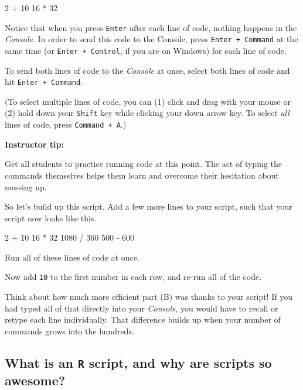 \documentclass[
]{book}
\newenvironment{Shaded}{\begin{snugshade}}{\end{snugshade}}
\newcommand{\DecValTok}[1]{\textcolor[rgb]{0.00,0.00,0.81}{#1}}
\newcommand{\SpecialCharTok}[1]{\textcolor[rgb]{0.00,0.00,0.00}{#1}}
\begin{document}
\begin{Shaded}
\begin{Highlighting}[]
\DecValTok{2}  \SpecialCharTok{+} \DecValTok{10}
\DecValTok{16} \SpecialCharTok{*} \DecValTok{32}
\end{Highlighting}
\end{Shaded}

Notice that when you press \texttt{Enter} after each line of code, nothing happens in the \emph{Console}. In order to send this code to the Console, press \texttt{Enter\ +\ Command} at the same time (or \texttt{Enter\ +\ Control}, if you are on Windows) for each line of code.

To send both lines of code to the \emph{Console} at once, select both lines of code and hit \texttt{Enter\ +\ Command}.

(To select multiple lines of code, you can (1) click and drag with your mouse or (2) hold down your \texttt{Shift} key while clicking your down arrow key. To select \emph{all} lines of code, press \texttt{Command\ +\ A}.)

\leavevmode{}%
\textbf{Instructor tip:}

Get all students to practice running code at this point. The act of typing the commands themselves helps them learn and overcome their hesitation about messing up.

So let's build up this script. Add a few more lines to your script, such that your script now looks like this.

\begin{Shaded}
\begin{Highlighting}[]
\DecValTok{2}  \SpecialCharTok{+} \DecValTok{10}
\DecValTok{16} \SpecialCharTok{*} \DecValTok{32}
\DecValTok{1080} \SpecialCharTok{/} \DecValTok{360}
\DecValTok{500} \SpecialCharTok{{-}} \DecValTok{600}
\end{Highlighting}
\end{Shaded}

Run all of these lines of code at once.

Now add \texttt{10} to the first number in each row, and re-run all of the code.

Think about how much more efficient part (B) was thanks to your script! If you had typed all of that directly into your \emph{Console}, you would have to recall or retype each line individually. That difference builds up when your number of commands grows into the hundreds.

\hypertarget{what-is-an-r-script-and-why-are-scripts-so-awesome}{%
\subsection*{\texorpdfstring{What is an \texttt{R} script, and why are scripts so awesome?}{What is an R script, and why are scripts so awesome?}}\label{what-is-an-r-script-and-why-are-scripts-so-awesome}}
\end{document}
